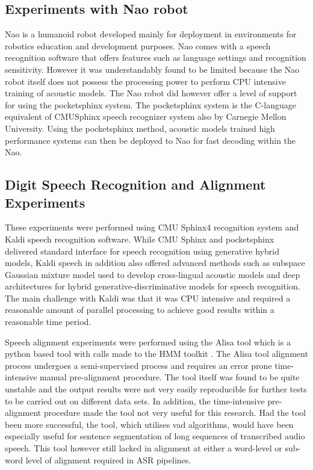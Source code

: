 \subsection{Experiments with Nao robot}
Nao is a humanoid robot developed mainly for deployment in environments for robotics education and development purposes.  Nao comes with a speech recognition software that offers features such as language settings and recognition sensitivity.  However it was understandably found to be limited because the Nao robot itself does not possess the processing power to perform CPU intensive training of acoustic models.  The Nao robot did however offer a level of support for using the pocketsphinx system. The pocketsphinx system is the C-language equivalent of CMUSphinx speech recognizer system also by Carnegie Mellon University.  Using the pocketsphinx method, acoustic models trained high performance systems can then be deployed to Nao for fast decoding within the Nao.  

\subsection{Digit Speech Recognition and Alignment Experiments}\label{sec_digitspeech}
These experiments were performed using CMU Sphinx4 recognition system and Kaldi speech recognition software.  While CMU Sphinx and pocketsphinx delivered standard interface for speech recognition using generative hybrid models, Kaldi speech in addition also offered advanced methods such as subspace Gaussian mixture model used to develop cross-lingual acoustic models and deep architectures for hybrid generative-discriminative models for speech recognition.   The main challenge with Kaldi was that it was CPU intensive and required a reasonable amount of parallel processing to achieve good results within a reasonable time period. 

Speech alignment experiments were performed using the Alisa \cite{stan2016alisa} tool which is a python based tool with calls made to the HMM toolkit \cite{young2002htk}.  The Alisa tool alignment process undergoes a semi-supervised process and requires an error prone time-intensive manual pre-alignment procedure.  The tool itself was found to be quite unstable and the output results were not very easily reproducible for further tests to be carried out on different data sets.  In addition, the time-intensive pre-alignment procedure made the tool not very useful for this research. Had the tool been more successful, the tool, which utilises \acrfull{vad} algorithms, would have been especially useful for sentence segmentation of long sequences of transcribed audio speech.  This tool however still lacked in alignment at either a word-level or sub-word level of alignment required in ASR pipelines.

